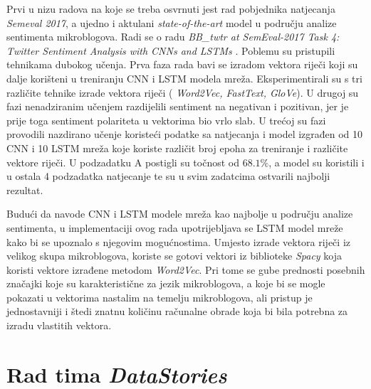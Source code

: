 \documentclass[times, utf8, zavrsni]{fer}
\begin{document}
Prvi u nizu radova na koje se treba osvrnuti jest rad pobjednika natjecanja \emph{Semeval 2017}, a ujedno i aktulani \textit{state-of-the-art} model u području analize sentimenta mikroblogova. Radi se o radu \textit{BB\_twtr at SemEval-2017 Task 4: Twitter Sentiment Analysis with CNNs and LSTMs} \citep{cliche-2017-bb}. Poblemu su pristupili tehnikama dubokog učenja. Prva faza rada bavi se izradom vektora riječi koji su dalje korišteni u treniranju CNN i LSTM modela mreža. Eksperimentirali su s tri različite tehnike izrade vektora riječi ( \textit{Word2Vec, FastText, GloVe}). U drugoj su fazi nenadziranim učenjem razdijelili sentiment na negativan i pozitivan, jer je prije toga sentiment polariteta u vektorima bio vrlo slab. U trećoj su fazi provodili nazdirano učenje koristeći podatke sa natjecanja i model izgrađen od 10 CNN i 10 LSTM mreža koje koriste različit broj epoha za treniranje i različite vektore riječi. U podzadatku A postigli su točnost od $68.1\%$, a model su koristili i u ostala 4 podzadatka natjecanje te su u svim zadatcima ostvarili najbolji rezultat.

Budući da navode \gls{CNN} i \gls{LSTM} modele mreža kao najbolje u području analize sentimenta, u implementaciji ovog rada upotrijebljava se \gls{LSTM} model mreže kako bi se upoznalo s njegovim mogućnostima. Umjesto izrade vektora riječi iz velikog skupa mikroblogova, koriste se gotovi vektori iz biblioteke \textit{Spacy} koja koristi vektore izrađene metodom \textit{Word2Vec}. Pri tome se gube prednosti posebnih značajki koje su karakteristične za jezik mikroblogova, a koje bi se mogle pokazati u vektorima nastalim na temelju mikroblogova, ali pristup je jednostavniji i štedi znatnu količinu računalne obrade koja bi bila potrebna za izradu vlastitih vektora.

\section{Rad tima \emph{DataStories}}
\end{document}
